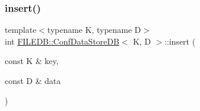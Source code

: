 \subsubsection{\texorpdfstring{insert()}{insert()}\hspace{0.1cm}{\footnotesize\ttfamily [2/2]}}
{\footnotesize\ttfamily template$<$typename K, typename D$>$ \\
int \mbox{\hyperlink{classFILEDB_1_1ConfDataStoreDB}{F\+I\+L\+E\+D\+B\+::\+Conf\+Data\+Store\+DB}}$<$ K, D $>$\+::insert (\begin{DoxyParamCaption}\item[{const K \&}]{key,  }\item[{const D \&}]{data }\end{DoxyParamCaption})\hspace{0.3cm}{\ttfamily [inline]}}

